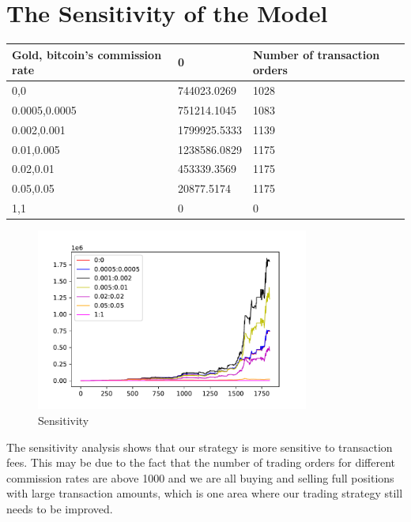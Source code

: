 \documentclass[12pt]{article}
\begin{document}
    \section{The Sensitivity of the Model}
    \begin{table}[H]
    \centering
    \begin{tabular}{|l|l|l|}
    \hline
        Gold, bitcoin's commission rate & 0 & Number of transaction orders  \\ \hline
        0,0 & 744023.0269 & 1028  \\ \hline
        0.0005,0.0005 & 751214.1045 & 1083  \\ \hline
        0.002,0.001 & 1799925.5333 & 1139  \\ \hline
        0.01,0.005 & 1238586.0829 & 1175  \\ \hline
        0.02,0.01 & 453339.3569 & 1175  \\ \hline
        0.05,0.05 & 20877.5174 & 1175  \\ \hline
        1,1 & 0 & 0  \\ \hline
    \end{tabular}
\end{table}

\begin{figure}[H]
    \centering
    \includegraphics[width=0.8\textwidth]{sensibility (1).pdf}
    \caption{Sensitivity}\label{fig:sensitivity}
\end{figure}

The sensitivity analysis shows that our strategy is more sensitive to transaction fees. This may be due to the fact that the number of trading orders for different commission rates are above 1000 and we are all buying and selling full positions with large transaction amounts, which is one area where our trading strategy still needs to be improved.
\end{document}
